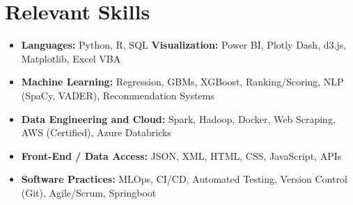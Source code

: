 \documentclass[letterpaper,11pt]{article}
\begin{document}
\vspace{-15pt}







\section{Relevant Skills}
\begin{itemize}[leftmargin=0.00in, label={}, itemsep=1px, parsep=0pt]






\item{

{\textbf{Languages:} Python, R, SQL}\hspace{0.7cm}
\small{\textbf{Visualization:} Power BI, Plotly Dash, d3.js, Matplotlib, Excel VBA}
}

\item{
{\textbf{Machine Learning:} Regression, GBMs, XGBoost, Ranking/Scoring, NLP (SpaCy, VADER), Recommendation Systems
}}



\item{
\small{\textbf{Data Engineering and Cloud:} Spark, Hadoop, Docker, Web Scraping, AWS (Certified), Azure Databricks}}


\item{
{\textbf{Front-End / Data Access:} JSON, XML, HTML, CSS, JavaScript, APIs}
}

\item{
{\textbf{Software Practices:} MLOps, CI/CD, Automated Testing, Version Control (Git), Agile/Scrum, Springboot}
}













\end{itemize}
\vspace{-18pt}







\end{document}
